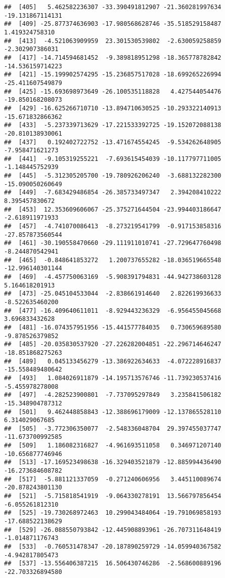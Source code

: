 \documentclass[
]{article}
\begin{document}
\begin{verbatim}
##  [405]   5.462582236307 -33.390491812907 -21.360281997634 -19.131867114131
##  [409] -25.877374636903 -17.980568628746 -35.518529158487   1.419324758310
##  [413]  -4.521063909959  23.301530539802  -2.630059258859  -2.302907386031
##  [417] -14.714594681452  -9.389818951298 -18.365778782842 -14.536159714223
##  [421] -15.199902574295 -15.236857517028 -18.699265226994 -25.411607549879
##  [425] -15.693698973649 -26.100535118828   4.427544054476 -19.850168208073
##  [429] -16.625266710710 -13.894710630525 -10.293322140913 -15.671832866362
##  [433]  -5.237339713629 -17.221533392725 -19.152072088138 -20.810138930061
##  [437]   0.192402722752 -13.471674554245  -9.534262648905  -7.958471621273
##  [441]  -9.105319255221  -7.693615454039 -10.117797711005  -1.148445752939
##  [445]  -5.312305205700 -19.780926206240  -3.688132282300 -15.090050260649
##  [449]  -7.683429486854 -26.385733497347   2.394208410222   8.395457830672
##  [453]  12.353609606067 -25.375271644504 -23.994403186647  -2.618911971933
##  [457]  -4.741070086413  -8.273219541799  -0.917153858316 -27.857873560544
##  [461] -30.190558470660 -29.111911010741 -27.729647760498  -8.244870542941
##  [465]  -0.848641853272   1.200737655282 -18.036519665548 -12.996140301144
##  [469]  -4.457750063169  -5.908391794831 -44.942738603128   5.164618201913
##  [473] -25.045104533044  -2.838661914640   2.822619936633  -8.522635460200
##  [477] -16.409640611011  -8.929443236329  -6.956455045668   3.696833432628
##  [481] -16.074357951956 -15.441577784035   0.730659689580  -9.878526379852
##  [485] -20.035830537920 -27.226282004851 -22.296714646247 -18.851868275263
##  [489]   0.045133456279 -13.386922634633  -4.072228916837 -15.558489480642
##  [493]   1.084026911879 -14.195713576746 -11.739230537416  -5.455978278008
##  [497]  -4.282523900801  -7.737095297849   3.235841506182 -15.348904787312
##  [501]   9.462448858843 -12.388696179009 -12.137865528110   6.314029067685
##  [505]  -3.772306350077  -2.548336048704  29.397455037747 -11.673700992585
##  [509]   1.186082316827  -4.961693511058   0.346971207140 -10.656877746946
##  [513] -17.169523498638 -16.329403521879 -12.885994436490 -16.273684608782
##  [517]  -5.881121337059  -0.271240606956   3.445110089674 -20.878243801130
##  [521]  -5.715818541919  -9.064330278191  13.566797856454  -6.055261812310
##  [525] -19.730268972463  10.299043484064 -19.791069858193 -17.688522138629
##  [529] -26.088550793842 -12.445908893961 -26.707311648419  -1.014871176743
##  [533]  -0.760531478347 -20.187890259729 -14.059940367582  -4.942817805473
##  [537] -13.556406387215  16.506430746286  -2.568600889196 -22.703326894580

\end{verbatim}
\end{document}
